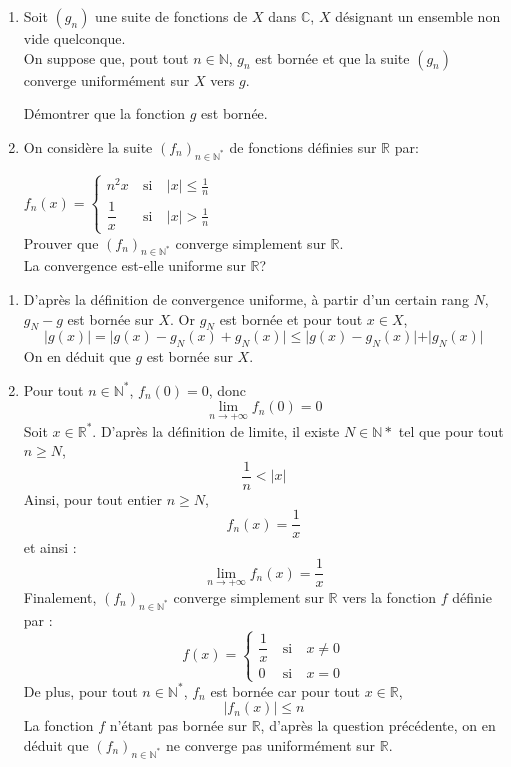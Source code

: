 \documentclass[a4paper,10pt]{report}
\begin{document}
\begin{Exa} 
\begin{enumerate}

\item Soit $(g_n)$ une suite de fonctions de $X$ dans $\mathbb{C}$, $X$ désignant un ensemble non vide quelconque.\\
 On suppose que, pout tout $n\in \mathbb{N}$, $g_n$ est bornée et que la suite $(g_n)$ converge uniformément sur $X$ vers $g$.

Démontrer que la fonction  $g$ est bornée.
\item
On considère la suite  $(f_n)_{n\in\mathbb{N}^*}$ de fonctions  définies sur $\mathbb{R}$ par:\\
\medskip

$f_n(x)=\left\lbrace \begin{array}{lll}
n^2x&\:\text{si}\:&|x|\leqslant \frac{1}{n}\\
\dfrac{1}{x}&\:\text{si}\:&|x|>\frac{1}{n}
\end{array}\right. $\\
Prouver que $(f_n)_{n\in\mathbb{N}^*}$  converge simplement sur $\mathbb{R}$.\\
La convergence est-elle uniforme sur $\mathbb{R}$?\\

\end{enumerate}
\end{Exa}

\corr \begin{enumerate}

\item D'après la définition de convergence uniforme, à partir d'un certain rang $N$, $g_N-g$ est bornée sur $X$. Or $g_N$ est bornée et pour tout $x \in X$,
$$ \vert g(x) \vert = \vert g(x)-g_N(x) + g_N(x) \vert \leq \vert g(x)-g_N(x) \vert + \vert g_N(x) \vert $$
On en déduit que $g$ est bornée sur $X$.
\item Pour tout $n\in\mathbb{N}^*$, $f_n(0)=0$, donc 
$$\lim\limits_{n\to +\infty}f_n(0)=0$$
Soit $x\in\mathbb{R}^*$. D'après la définition de limite, il existe $N \in \mathbb{N}*$ tel que pour tout $n \geq N$,
$$ \dfrac{1}{n}<|x|$$
Ainsi, pour tout entier $n \geq N$,
$$ f_n(x)=\dfrac{1}{x}$$
et ainsi :
$$\lim\limits_{n\to +\infty}^{}f_n(x)=\dfrac{1}{x}$$
Finalement, $(f_n)_{n\in\mathbb{N}^*}$  converge simplement sur $\mathbb{R}$ vers la fonction $f$ définie par :
$$f(x)=\left\lbrace \begin{array}{lll}
\dfrac{1}{x}&\:\text{si}\:&x\neq 0\\
0&\:\text{si}\:&x=0
\end{array}\right. $$
De plus, pour tout $n\in\mathbb{N}^*$, $f_n$ est bornée car pour tout $x \in \mathbb{R}$,
$$|f_n(x)|\leqslant n$$
La fonction $f$ n'étant pas bornée sur $\mathbb{R}$, d'après la question précédente,  on en déduit que $(f_n)_{n\in\mathbb{N}^*}$  ne converge pas uniformément sur $\mathbb{R}$.
\end{enumerate}
\end{document}
